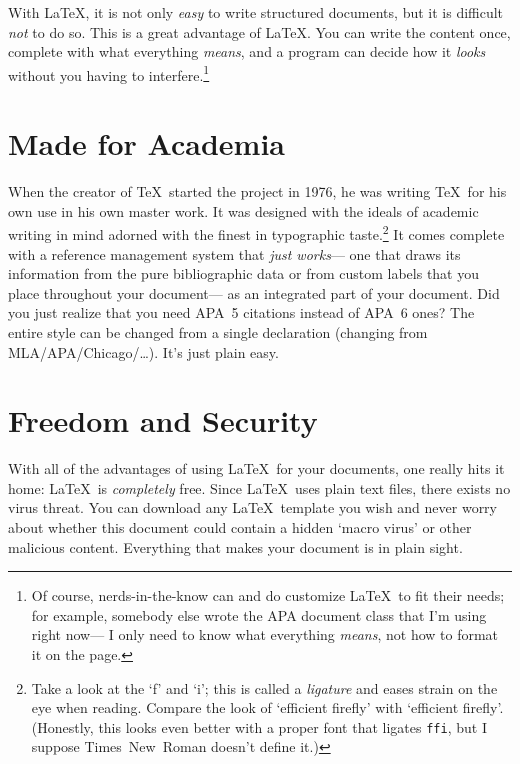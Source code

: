 \documentclass{psypaper}
\begin{document}
With \LaTeX, it is not only \emph{easy} to write structured documents,
  but it is difficult \emph{not} to do so.
This is a great advantage of \LaTeX.
You can write the content once,
  complete with what everything \emph{means},
  and a program can decide how it \emph{looks}
  without you having to interfere.\footnote{%
    Of course, nerds-in-the-know can and do customize \LaTeX\ to fit their needs;
    for example, somebody else wrote the APA document class that I'm using right now---%
    I only need to know what everything \emph{means},
    not how to format it on the page.}

\section{Made for Academia}
When the creator of \TeX\ started the project in 1976,
  he was writing \TeX\ for his own use in his own master work.
It was designed with the ideals of academic writing in mind
  adorned with the finest in typographic taste.\footnote{%
    Take a look at the `f' and `i';
    this is called a \textit{ligature} and eases strain on the eye when reading.
    Compare the look of `ef{}f{}icient f{}iref{}ly' with `efficient firefly'.
    (Honestly, this looks even better with a proper font that ligates \texttt{ffi},
    but I suppose Times~New~Roman doesn't define it.)}
It comes complete with a reference management system that \emph{just works}---%
  one that draws its information from the pure bibliographic data
  or from custom labels that you place throughout your document---%
  as an integrated part of your document.
Did you just realize that you need APA~5 citations instead of APA~6 ones?
The entire style can be changed from a single declaration
  (changing from MLA\slash APA\slash Chicago\slash\dots).
It's just plain easy.

\section{Freedom and Security}
With all of the advantages of using \LaTeX\ for your documents,
  one really hits it home:
  \LaTeX\ is \emph{completely} free.
Since \LaTeX\ uses plain text files,
  there exists no virus threat.
You can download any \LaTeX\ template you wish and
  never worry about whether this document
  could contain a hidden `macro virus'
  or other malicious content.
Everything that makes your document
  is in plain sight.
\end{document}
